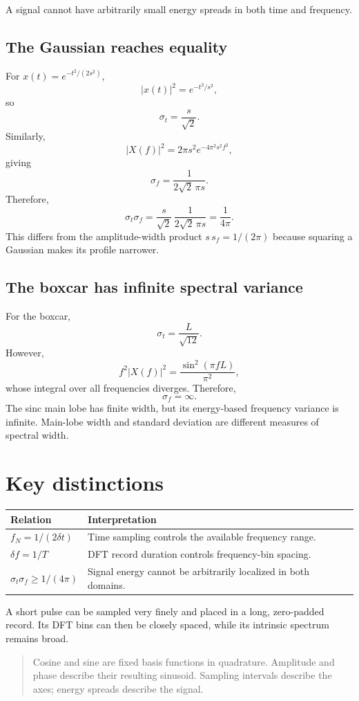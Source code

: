 \documentclass[11pt,letterpaper]{article}
\begin{document}
A signal cannot have arbitrarily small energy spreads in both time
and frequency.

\subsection*{The Gaussian reaches equality}

For $x(t)=e^{-t^2/(2s^2)}$,
\[
|x(t)|^2=e^{-t^2/s^2},
\]
so
\[
\sigma_t=\frac{s}{\sqrt2}.
\]
Similarly,
\[
|X(f)|^2=2\pi s^2e^{-4\pi^2s^2f^2},
\]
giving
\[
\sigma_f=\frac{1}{2\sqrt2\,\pi s}.
\]
Therefore,
\begin{equation}
\boxed{
\sigma_t\sigma_f
=\frac{s}{\sqrt2}\,
\frac{1}{2\sqrt2\,\pi s}
=\frac{1}{4\pi}.
}
\end{equation}
This differs from the amplitude-width product $s\,s_f=1/(2\pi)$
because squaring a Gaussian makes its profile narrower.

\subsection*{The boxcar has infinite spectral variance}

For the boxcar,
\[
\sigma_t=\frac{L}{\sqrt{12}}.
\]
However,
\[
f^2|X(f)|^2=\frac{\sin^2(\pi fL)}{\pi^2},
\]
whose integral over all frequencies diverges. Therefore,
\[
\sigma_f=\infty.
\]
The sinc main lobe has finite width, but its energy-based frequency
variance is infinite. Main-lobe width and standard deviation are
different measures of spectral width.

\section{Key distinctions}

\begin{center}
\begin{tabular}{lp{}}
\toprule
Relation & Interpretation\\
\midrule
$f_N=1/(2\delta t)$ &
Time sampling controls the available frequency range.\\[4pt]
$\delta f=1/T$ &
DFT record duration controls frequency-bin spacing.\\[4pt]
$\sigma_t\sigma_f\geq1/(4\pi)$ &
Signal energy cannot be arbitrarily localized in both domains.\\
\bottomrule
\end{tabular}
\end{center}

A short pulse can be sampled very finely and placed in a long,
zero-padded record. Its DFT bins can then be closely spaced, while
its intrinsic spectrum remains broad.

\begin{quote}
Cosine and sine are fixed basis functions in quadrature.
Amplitude and phase describe their resulting sinusoid.
Sampling intervals describe the axes; energy spreads describe
the signal.
\end{quote}
\end{document}
